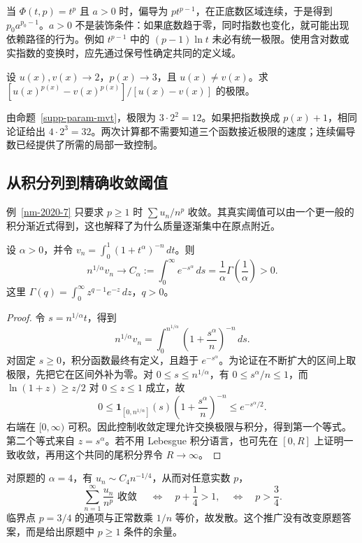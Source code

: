 \documentclass[12pt,fontset=fandol]{ctexart}
\begin{document}
当 $\Phi(t,p)=t^p$ 且 $a>0$ 时，偏导为 $pt^{p-1}$，在正底数区域连续，于是得到 $p_0a^{p_0-1}$。$a>0$ 不是装饰条件：如果底数趋于零，同时指数也变化，就可能出现依赖路径的行为。例如 $t^{p-1}$ 中的 $(p-1)\ln t$ 未必有统一极限。使用含对数或实指数的变换时，应先通过保号性确定共同的定义域。

\begin{example}
设 $u(x),v(x)\to2$，$p(x)\to3$，且 $u(x)\ne v(x)$。求 $[u(x)^{p(x)}-v(x)^{p(x)}]/[u(x)-v(x)]$ 的极限。
\end{example}
\begin{solve}
由命题~\ref{supp-param-mvt}，极限为 $3\cdot2^2=12$。如果把指数换成 $p(x)+1$，相同论证给出 $4\cdot2^3=32$。两次计算都不需要知道三个函数接近极限的速度；连续偏导数已经提供了所需的局部一致控制。
\end{solve}

\subsection{从积分列到精确收敛阈值}
例~\ref{nm-2020-7} 只要求 $p\geq1$ 时 $\sum u_n/n^p$ 收敛。其真实阈值可以由一个更一般的积分渐近式得到，这也解释了为什么质量逐渐集中在原点附近。

\begin{theorem}[端点集中的幂尺度]\label{supp-boundary-scale}
设 $\alpha>0$，并令 $v_n=\int_0^1(1+t^\alpha)^{-n}\,dt$。则
\[
 n^{1/\alpha}v_n\longrightarrow
 C_\alpha:=\int_0^\infty e^{-s^\alpha}\,ds
 =\frac1\alpha\Gamma\left(\frac1\alpha\right)>0.
\]
这里 $\Gamma(q)=\int_0^\infty z^{q-1}e^{-z}\,dz$，$q>0$。
\end{theorem}
\begin{proof}
令 $s=n^{1/\alpha}t$，得到
\[
 n^{1/\alpha}v_n=\int_0^{n^{1/\alpha}}
 \left(1+\frac{s^\alpha}{n}\right)^{-n}\,ds.
\]
对固定 $s\geq0$，积分函数最终有定义，且趋于 $e^{-s^\alpha}$。为论证在不断扩大的区间上取极限，先把它在区间外补为零。对 $0\leq s\leq n^{1/\alpha}$，有 $0\leq s^\alpha/n\leq1$，而 $\ln(1+z)\geq z/2$ 对 $0\leq z\leq1$ 成立，故
\[
 0\leq\mathbf1_{[0,n^{1/\alpha}]}(s)
 \left(1+\frac{s^\alpha}{n}\right)^{-n}\leq e^{-s^\alpha/2}.
\]
右端在 $[0,\infty)$ 可积。因此控制收敛定理允许交换极限与积分，得到第一个等式。第二个等式来自 $z=s^\alpha$。若不用 Lebesgue 积分语言，也可先在 $[0,R]$ 上证明一致收敛，再用这个共同的尾积分界令 $R\to\infty$。
\end{proof}

对原题的 $\alpha=4$，有 $u_n\sim C_4n^{-1/4}$，从而对任意实数 $p$，
\[
 \sum_{n=1}^\infty\frac{u_n}{n^p}
 \text{ 收敛 }\quad\Longleftrightarrow\quad p+\frac14>1,
 \quad\Longleftrightarrow\quad p>\frac34.
\]
临界点 $p=3/4$ 的通项与正常数乘 $1/n$ 等价，故发散。这个推广没有改变原题答案，而是给出原题中 $p\geq1$ 条件的余量。
\end{document}
